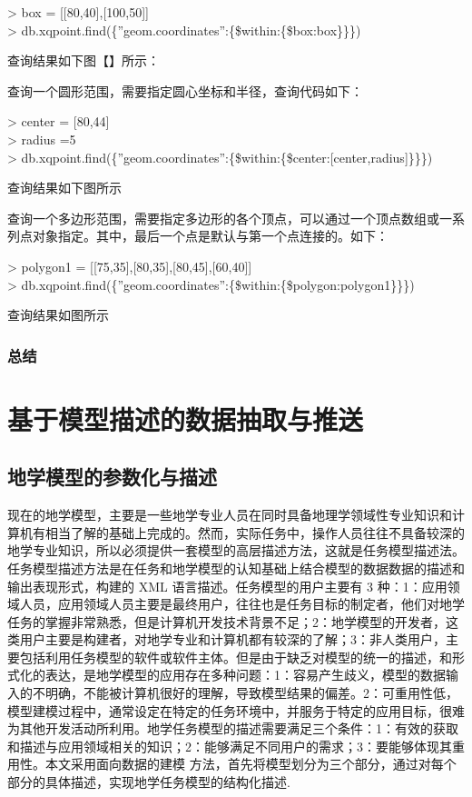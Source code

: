 \documentclass[master]{njnuthesis}
\begin{document}
\noindent > box = [[80,40],[100,50]]\\
> db.xqpoint.find(\{''geom.coordinates'':\{\$within:\{\$box:box\}\}\})

查询结果如下图【】所示：

查询一个圆形范围，需要指定圆心坐标和半径，查询代码如下：

\noindent > center = [80,44]\\
> radius =5\\
> db.xqpoint.find(\{''geom.coordinates'':\{\$within:\{\$center:[center,radius]\}\}\})

查询结果如下图所示

    查询一个多边形范围，需要指定多边形的各个顶点，可以通过一个顶点数组或一系列点对象指定。其中，最后一个点是默认与第一个点连接的。如下：

\noindent > polygon1 = [[75,35],[80,35],[80,45],[60,40]]\\
> db.xqpoint.find(\{''geom.coordinates'':\{\$within:\{\$polygon:polygon1\}\}\})

查询结果如图所示

\subsection{总结}


\chapter{基于模型描述的数据抽取与推送}
\section{地学模型的参数化与描述}
现在的地学模型，主要是一些地学专业人员在同时具备地理学领域性专业知识和计算机有相当了解的基础上完成的。然而，实际任务中，操作人员往往不具备较深的地学专业知识，所以必须提供一套模型的高层描述方法，这就是任务模型描述法。任务模型描述方法是在任务和地学模型的认知基础上结合模型的数据数据的描述和输出表现形式，构建的 XML 语言描述。任务模型的用户主要有 3 种：1：应用领域人员，应用领域人员主要是最终用户，往往也是任务目标的制定者，他们对地学任务的掌握非常熟悉，但是计算机开发技术背景不足；2：地学模型的开发者，这类用户主要是构建者，对地学专业和计算机都有较深的了解；3：非人类用户，主要包括利用任务模型的软件或软件主体。但是由于缺乏对模型的统一的描述，和形式化的表达，是地学模型的应用存在多种问题：1：容易产生歧义，模型的数据输入的不明确，不能被计算机很好的理解，导致模型结果的偏差。2：可重用性低，模型建模过程中，通常设定在特定的任务环境中，并服务于特定的应用目标，很难为其他开发活动所利用。地学任务模型的描述需要满足三个条件：1：有效的获取和描述与应用领域相关的知识；2：能够满足不同用户的需求；3：要能够体现其重用性。本文采用面向数据的建模
方法，首先将模型划分为三个部分，通过对每个部分的具体描述，实现地学任务模型的结构化描述.
\end{document}
